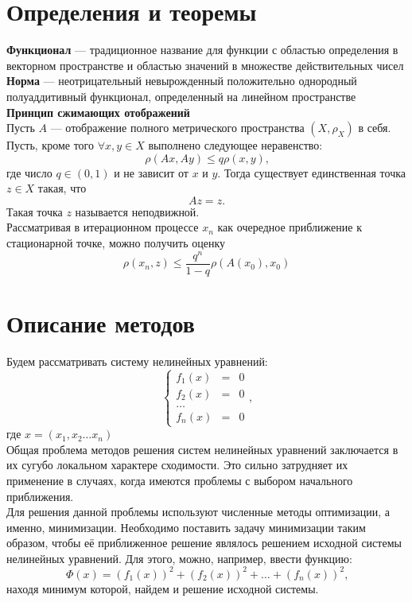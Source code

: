 \documentclass[a4paper, 12pt]{article}
\begin{document}
\section*{Определения и теоремы}
\textbf{Функционал} --- традиционное название для функции с областью определения в векторном пространстве и областью значений в множестве действительных чисел\\
\textbf{Норма} --- неотрицательный невырожденный положительно однородный полуаддитивный функционал, определенный на линейном пространстве \\
\textbf{Принцип сжимающих отображений}\\
Пусть $A$ --- отображение полного метрического пространства $(X,\rho_X)$ в себя. Пусть, 
кроме того $\forall x,y \in X$ выполнено следующее неравенство:
\begin{equation}
	\rho (Ax,Ay) \leq q \rho(x,y) \text{,}
\end{equation}
где число $q \in (0,1)$ и не зависит от $x$ и $y$. Тогда существует единственная точка 
$z \in X$ такая, что
\begin{equation}
	Az = z \text{.}
\end{equation}
Такая точка $z$ называется неподвижной.\\
Рассматривая в итерационном процессе $x_n$ как очередное приближение к стационарной точке, можно получить оценку
\begin{equation}
	\rho (x_n,z) \leq \frac{q^n}{1-q} \rho(A(x_0),x_0)
\end{equation}
\nocite{BH}

\newpage
\section*{Описание методов}
Будем рассматривать систему нелинейных уравнений:
\[
\left\{
\begin{array}{ccc}	f_1(x) & = &  0\\
	f_2(x) & = &  0\\
	\ldots \\
	f_n(x) & = &  0 
\end{array}
\text{,}
\right.
\]
где $x = (x_1, x_2 \ldots x_n)$\\
Общая проблема методов решения систем нелинейных уравнений заключается в их сугубо локальном
характере сходимости. Это сильно затрудняет их применение в случаях, когда имеются проблемы с 
выбором начального приближения.\\
Для решения данной проблемы используют численные методы оптимизации, а именно, минимизации.
Необходимо поставить задачу минимизации таким образом, чтобы её приближенное решение являлось решением 
исходной системы нелинейных уравнений. Для этого, можно, например, ввести функцию:
\begin{equation*}
	\Phi(x) = (f_1(x))^2 + (f_2(x))^2 + \ldots + (f_n(x))^2 \text{,}
\end{equation*}
находя минимум которой, найдем и решение исходной системы. 
\end{document}
